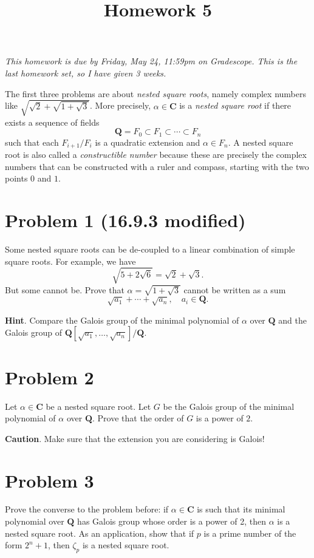 \documentclass{amsart}
\date{}
\title{Homework 5}
\begin{document}
\maketitle
\emph{This homework is due by Friday, May 24, 11:59pm on Gradescope.  This is the last homework set, so I have given 3 weeks.}
\bigskip

The first three problems are about \emph{nested square roots}, namely complex numbers like \(\sqrt{\sqrt 2 + \sqrt{1 + \sqrt 3}}\).
More precisely, \(\alpha \in \mathbf{C}\) is a \emph{nested square root} if there exists a sequence of fields
\[ \mathbf{Q} = F_0 \subset F_1 \subset \cdots \subset F_n\]
such that each \(F_{i+1}/F_{i}\) is a quadratic extension and \(\alpha \in F_{n}\).
A nested square root is also called a \emph{constructible number} because these are precisely the complex numbers that can be constructed with a ruler and compass, starting with the two points \(0\) and \(1\).
\section{Problem 1  (16.9.3 modified)}
\label{sec:org6722f98}

Some nested square roots can be de-coupled to a linear combination of simple square roots.
For example, we have
\[ \sqrt {5 + 2\sqrt 6} = \sqrt 2 + \sqrt 3.\]
But some cannot be.
Prove that \(\alpha = \sqrt{1 + \sqrt 3}\) cannot be written as a sum
\[ \sqrt{a_{1}} + \cdots + \sqrt{a_{n}}, \quad a_i \in \mathbf{Q}.\]

\textbf{Hint}. Compare the Galois group of the minimal polynomial of \(\alpha\) over \(\mathbf{Q}\) and the Galois group of \(\mathbf{Q}[\sqrt{a_1}, \dots, \sqrt{a_n}] / \mathbf{Q}.\)
\section{Problem 2}
\label{sec:org385d7f9}

Let \(\alpha \in \mathbf{C}\) be a nested square root.
Let \(G\) be the Galois group of the minimal polynomial of \(\alpha\) over \(\mathbf{Q}\).
Prove that the order of \(G\) is a power of \(2\).

\textbf{Caution}. Make sure that the extension you are considering is Galois!
\section{Problem 3}
\label{sec:orgf6d994a}

Prove the converse to the problem before: if \(\alpha \in \mathbf{C}\) is such that its minimal polynomial over \(\mathbf{Q}\) has Galois group whose order is a power of 2, then \(\alpha\) is a nested square root.
As an application, show that if \(p\) is a prime number of the form \(2^n+1\), then \(\zeta_p\) is a nested square root.
\end{document}
